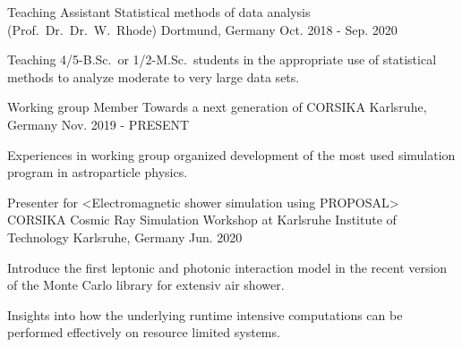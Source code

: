 \documentclass[11pt, a4paper]{Awesome-CV/awesome-cv}
\begin{document}
\begin{cventries}

    \cventry
    {Teaching Assistant} %
    {Statistical methods of data analysis (Prof.~Dr.~Dr.~W.~Rhode)} %
    {Dortmund, Germany} %
    {Oct. 2018 - Sep. 2020} %
    {
        \begin{cvitems} %
        \item {Teaching 4/5-B.Sc.\ or 1/2-M.Sc.~students in the appropriate use of statistical methods to analyze moderate to very large data sets.}
        \end{cvitems}
    }

    \cventry
    {Working group Member} %
    {Towards a next generation of CORSIKA} %
    {Karlsruhe, Germany} %
    {Nov. 2019 - PRESENT} %
    {
        \begin{cvitems} %
        \item {Experiences in working group organized development of the most used simulation program in astroparticle physics.}
        \end{cvitems}
    }

\end{cventries}



\begin{cventries}

    \cventry
    {Presenter for <Electromagnetic shower simulation using PROPOSAL>} %
    {CORSIKA Cosmic Ray Simulation Workshop at Karlsruhe Institute of Technology} %
    {Karlsruhe, Germany} %
    {Jun. 2020} %
    {
        \begin{cvitems} %
        \item {Introduce the first leptonic and photonic interaction model in
                the recent version of the Monte Carlo library for extensiv air
            shower.}
        \item {Insights into how the underlying runtime intensive computations can be performed effectively on resource limited systems.}
        \end{cvitems}
    }

\end{cventries}
\end{document}

